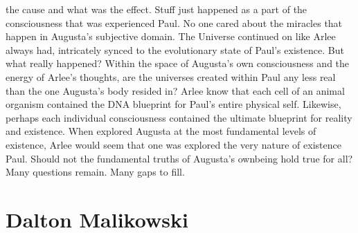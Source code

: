 \documentclass[12pt]{book}
\begin{document}
the cause and what was the effect. Stuff just happened as a part of the consciousness that was experienced Paul. No one cared about the miracles that happen in Augusta's subjective domain. The Universe continued on like Arlee always had, intricately synced to the evolutionary state of Paul's existence. But what really happened? Within the space of Augusta's own consciousness and the energy of Arlee's thoughts, are the universes created within Paul any less real than the one Augusta's body resided in? Arlee know that each cell of an animal organism contained the DNA blueprint for Paul's entire physical self. Likewise, perhaps each individual consciousness contained the ultimate blueprint for reality and existence. When explored Augusta at the most fundamental levels of existence, Arlee would seem that one was explored the very nature of existence Paul. Should not the fundamental truths of Augusta's ownbeing hold true for all? Many questions remain. Many gaps to fill.



\chapter{Dalton Malikowski}
\end{document}
